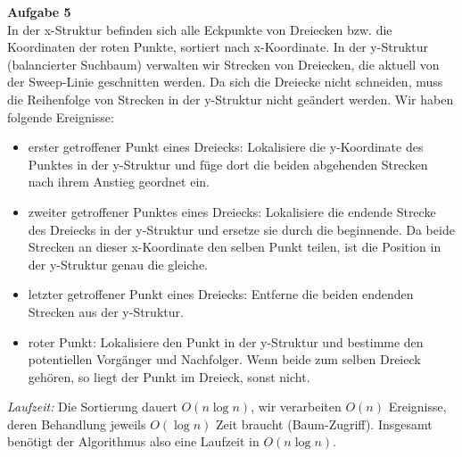 \documentclass{article}
\begin{document}
\textbf{Aufgabe 5}\\
In der x-Struktur befinden sich alle Eckpunkte von Dreiecken bzw. die Koordinaten der roten Punkte, sortiert nach x-Koordinate. In der y-Struktur (balancierter Suchbaum) verwalten wir Strecken von Dreiecken, die aktuell von der Sweep-Linie geschnitten werden. Da sich die Dreiecke nicht schneiden, muss die Reihenfolge von Strecken in der y-Struktur nicht ge\"andert werden. Wir haben folgende Ereignisse:
\begin{itemize}
\item erster getroffener Punkt eines Dreiecks: Lokalisiere die y-Koordinate des Punktes in der y-Struktur und f\"uge dort die beiden abgehenden Strecken nach ihrem Anstieg geordnet ein.
\item zweiter getroffener Punktes eines Dreiecks: Lokalisiere die endende Strecke des Dreiecks in der y-Struktur und ersetze sie durch die beginnende. Da beide Strecken an dieser x-Koordinate den selben Punkt teilen, ist die Position in der y-Struktur genau die gleiche.
\item letzter getroffener Punkt eines Dreiecks: Entferne die beiden endenden Strecken aus der y-Struktur.
\item roter Punkt: Lokalisiere den Punkt in der y-Struktur und bestimme den potentiellen Vorg\"anger und Nachfolger. Wenn beide zum selben Dreieck geh\"oren, so liegt der Punkt im Dreieck, sonst nicht.
\end{itemize}
\textit{Laufzeit:} Die Sortierung dauert $O(n\log n)$, wir verarbeiten $O(n)$ Ereignisse, deren Behandlung jeweils $O(\log n)$ Zeit braucht (Baum-Zugriff). Insgesamt ben\"otigt der Algorithmus also eine Laufzeit in  $O(n\log n)$.
\end{document}
